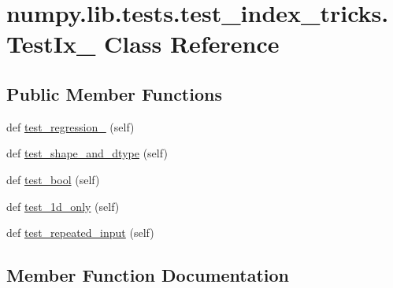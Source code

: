 \hypertarget{classnumpy_1_1lib_1_1tests_1_1test__index__tricks_1_1TestIx__}{}\section{numpy.\+lib.\+tests.\+test\+\_\+index\+\_\+tricks.\+Test\+Ix\+\_\+ Class Reference}
\label{classnumpy_1_1lib_1_1tests_1_1test__index__tricks_1_1TestIx__}
\subsection*{Public Member Functions}
\begin{DoxyCompactItemize}
\item 
def \hyperlink{classnumpy_1_1lib_1_1tests_1_1test__index__tricks_1_1TestIx___a3ce4ccebd920ac8805a48fb34b95710c}{test\+\_\+regression\+\_} (self)
\item 
def \hyperlink{classnumpy_1_1lib_1_1tests_1_1test__index__tricks_1_1TestIx___a76685d5b750919d7698362feea94430f}{test\+\_\+shape\+\_\+and\+\_\+dtype} (self)
\item 
def \hyperlink{classnumpy_1_1lib_1_1tests_1_1test__index__tricks_1_1TestIx___aaa9eb8188341b1584650b242d6fe2b26}{test\+\_\+bool} (self)
\item 
def \hyperlink{classnumpy_1_1lib_1_1tests_1_1test__index__tricks_1_1TestIx___a3059893f2354a425b1b222fb2fbeb66c}{test\+\_\+1d\+\_\+only} (self)
\item 
def \hyperlink{classnumpy_1_1lib_1_1tests_1_1test__index__tricks_1_1TestIx___a895bbe1ad46648fa94a554c836fe497b}{test\+\_\+repeated\+\_\+input} (self)
\end{DoxyCompactItemize}


\subsection{Member Function Documentation}
\mbox{\label{classnumpy_1_1lib_1_1tests_1_1test__index__tricks_1_1TestIx___a3059893f2354a425b1b222fb2fbeb66c}} 
